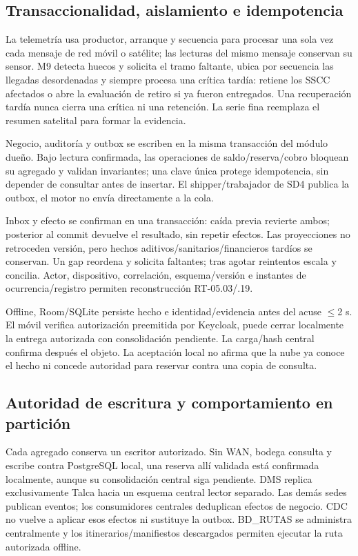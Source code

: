 \subsection{Transaccionalidad, aislamiento e idempotencia}
\label{sec:sd5-5-2-2}

La telemetría usa productor, arranque y secuencia para procesar una sola vez cada mensaje de red móvil o satélite; las lecturas del mismo mensaje conservan su sensor. M9 detecta huecos y solicita el tramo faltante, ubica por secuencia las llegadas desordenadas y siempre procesa una crítica tardía: retiene los SSCC afectados o abre la evaluación de retiro si ya fueron entregados. Una recuperación tardía nunca cierra una crítica ni una retención. La serie fina reemplaza el resumen satelital para formar la evidencia.

Negocio, auditoría y outbox se escriben en la misma transacción del módulo dueño. Bajo lectura confirmada, las operaciones de saldo/reserva/cobro bloquean su agregado y validan invariantes; una clave única protege idempotencia, sin depender de consultar antes de insertar. El shipper/trabajador de SD4 publica la outbox, el motor no envía directamente a la cola.

Inbox y efecto se confirman en una transacción: caída previa revierte ambos; posterior al commit devuelve el resultado, sin repetir efectos. Las proyecciones no retroceden versión, pero hechos aditivos/sanitarios/financieros tardíos se conservan. Un gap reordena y solicita faltantes; tras agotar reintentos escala y concilia. Actor, dispositivo, correlación, esquema/versión e instantes de ocurrencia/registro permiten reconstrucción RT-05.03/.19.

Offline, Room/SQLite persiste hecho e identidad/evidencia antes del acuse \ensuremath{\leq}2 s. El móvil verifica autorización preemitida por Keycloak, puede cerrar localmente la entrega autorizada con consolidación pendiente. La carga/hash central confirma después el objeto. La aceptación local no afirma que la nube ya conoce el hecho ni concede autoridad para reservar contra una copia de consulta.

\subsection{Autoridad de escritura y comportamiento en partición}
\label{sec:sd5-5-2-3}

Cada agregado conserva un escritor autorizado. Sin WAN, bodega consulta y escribe contra PostgreSQL local, una reserva allí validada está confirmada localmente, aunque su consolidación central siga pendiente. DMS replica exclusivamente Talca hacia un esquema central lector separado. Las demás sedes publican eventos; los consumidores centrales deduplican efectos de negocio. CDC no vuelve a aplicar esos efectos ni sustituye la outbox. BD\_RUTAS se administra centralmente y los itinerarios/manifiestos descargados permiten ejecutar la ruta autorizada offline.

